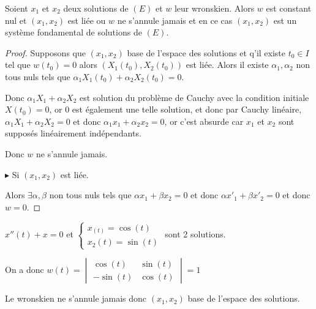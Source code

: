 \begin{theoreme}{}{}
    Soient $x_1$ et $x_2$ deux solutions de $(E)$ et $w$ leur wronskien. Alors $w$ est constant nul 
    et $(x_1, x_2)$ est liée ou $w$ ne s'annule jamais et en ce cas $(x_1, x_2)$ est un système fondamental de solutions de $(E)$.
\end{theoreme}


\begin{proof}
    Supposons que $(x_1, x_2)$ base de l'espace des solutions et q'il existe $t_0 \in I$
    tel que $w(t_0) = 0$ alors 
    $(X_1(t_0), X_2(t_0))$ est liée. Alors il existe $\alpha_1, \alpha_2$ non tous nuls 
    tels que $\alpha_1 X_1(t_0) + \alpha_2 X_2(t_0) = 0$.

    Donc $\alpha_1 X_1 + \alpha_2 X_2$ est solution du problème de Cauchy avec la condition 
    initiale $X(t_0) = 0$, or $0$ est également une telle solution, et donc par 
    Cauchy linéaire, $\alpha_1 X_1 + \alpha_2 X_2 = 0$ et 
    donc $\alpha_1 x_1 + \alpha_2 x_2 = 0$, or c'est absurde car $x_1$ et $x_2$ sont supposés linéairement indépendants.

    Donc $w$ ne s'annule jamais. 

    \lvspace $\blacktriangleright$ Si $(x_1, x_2)$ est liée. 

    Alors $\exists \alpha, \beta $ non tous nuls tels que $\alpha x_1 + \beta x_2 = 0$
    et donc $\alpha x'_1 + \beta x'_2 = 0$ et donc $w = 0$.
\end{proof}

\begin{exemple}
    $x''(t) + x = 0$ et 
    $\begin{cases}
        x_(t) = \cos (t) \\
        x_2(t) = \sin (t)
    \end{cases}$ sont 2 solutions. 

    On a donc $w(t) = \begin{vmatrix}
    \cos (t) & \sin (t) \\
    -\sin (t) & \cos (t)
    \end{vmatrix} = 1$ 

    Le wronskien ne s'annule jamais donc $(x_1, x_2)$ base de l'espace des solutions. 
\end{exemple}


